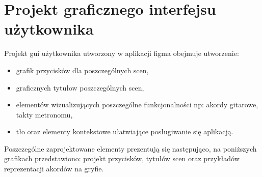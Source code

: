 




\section{Projekt graficznego interfejsu użytkownika}

Projekt gui użytkownika utworzony w aplikacji figma obejmuje utworzenie:

\begin{itemize}
	\item grafik przycisków dla poszczególnych scen,
	\item graficznych tytułow poszczególnych scen,
	\item elementów wizualizujących poszczególne funkcjonalności np: akordy gitarowe, takty metronomu,
	\item tło oraz elementy kontekstowe ułatwiające posługiwanie się aplikacją.
\end{itemize}

Poszczególne zaprojektowane elementy prezentują się następująco, na poniższych grafikach przedstawiono: projekt przycisków, tytułów scen oraz przykładów reprezentacji akordów na gryfie. 

